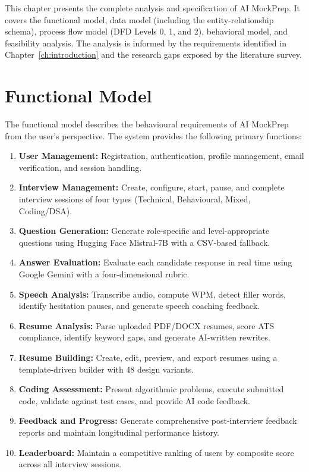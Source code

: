 \documentclass[12pt,a4paper,oneside]{report}
\begin{document}
This chapter presents the complete analysis and specification of AI MockPrep. It covers the functional model, data model (including the entity-relationship schema), process flow model (DFD Levels 0, 1, and 2), behavioral model, and feasibility analysis. The analysis is informed by the requirements identified in Chapter~\ref{ch:introduction} and the research gaps exposed by the literature survey.

\section{Functional Model}
\label{sec:functional_model}

The functional model describes the behavioural requirements of AI MockPrep from the user's perspective. The system provides the following primary functions:

\begin{enumerate}
  \item \textbf{User Management:} Registration, authentication, profile management, email verification, and session handling.
  \item \textbf{Interview Management:} Create, configure, start, pause, and complete interview sessions of four types (Technical, Behavioural, Mixed, Coding/DSA).
  \item \textbf{Question Generation:} Generate role-specific and level-appropriate questions using Hugging Face Mistral-7B with a CSV-based fallback.
  \item \textbf{Answer Evaluation:} Evaluate each candidate response in real time using Google Gemini with a four-dimensional rubric.
  \item \textbf{Speech Analysis:} Transcribe audio, compute WPM, detect filler words, identify hesitation pauses, and generate speech coaching feedback.
  \item \textbf{Resume Analysis:} Parse uploaded PDF/DOCX resumes, score ATS compliance, identify keyword gaps, and generate AI-written rewrites.
  \item \textbf{Resume Building:} Create, edit, preview, and export resumes using a template-driven builder with 48 design variants.
  \item \textbf{Coding Assessment:} Present algorithmic problems, execute submitted code, validate against test cases, and provide AI code feedback.
  \item \textbf{Feedback and Progress:} Generate comprehensive post-interview feedback reports and maintain longitudinal performance history.
  \item \textbf{Leaderboard:} Maintain a competitive ranking of users by composite score across all interview sessions.
\end{enumerate}
\end{document}
